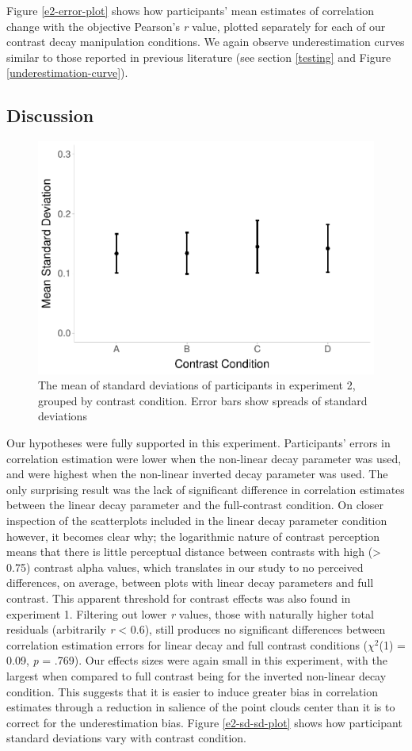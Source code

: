 \documentclass[preprint, 3p,
authoryear]{elsarticle} %
\begin{document}
Figure \ref{e2-error-plot} shows how participants' mean estimates of
correlation change with the objective Pearson's \emph{r} value, plotted
separately for each of our contrast decay manipulation conditions. We
again observe underestimation curves similar to those reported in
previous literature (see section \ref{testing} and Figure
\ref{underestimation-curve}).

\hypertarget{discussion-1}{%
\subsection{Discussion}\label{discussion-1}}

\begin{figure}

\includegraphics[width=0.5\linewidth]{contrast_and_scatterplots_files/figure-latex/e2-sd-sd-plot-1} \hfill{}

\caption{\label{e2-sd-sd-plot}The mean of standard deviations of participants in experiment 2, grouped by contrast condition. Error bars show spreads of standard deviations}\label{fig:e2-sd-sd-plot}
\end{figure}

Our hypotheses were fully supported in this experiment. Participants'
errors in correlation estimation were lower when the non-linear decay
parameter was used, and were highest when the non-linear inverted decay
parameter was used. The only surprising result was the lack of
significant difference in correlation estimates between the linear decay
parameter and the full-contrast condition. On closer inspection of the
scatterplots included in the linear decay parameter condition however,
it becomes clear why; the logarithmic nature of contrast perception
\citep{varshney_2013, fechner_1948} means that there is little
perceptual distance between contrasts with high (\textgreater{} 0.75)
contrast alpha values, which translates in our study to no perceived
differences, on average, between plots with linear decay parameters and
full contrast. This apparent threshold for contrast effects was also
found in experiment 1. Filtering out lower \emph{r} values, those with
naturally higher total residuals (arbitrarily \emph{r} \textless{} 0.6),
still produces no significant differences between correlation estimation
errors for linear decay and full contrast conditions (\(\chi^2\)(1) =
0.09, \emph{p} = .769). Our effects sizes were again small in this
experiment, with the largest when compared to full contrast being for
the inverted non-linear decay condition. This suggests that it is easier
to induce greater bias in correlation estimates through a reduction in
salience of the point clouds center than it is to correct for the
underestimation bias. Figure \ref{e2-sd-sd-plot} shows how participant
standard deviations vary with contrast condition.
\end{document}
